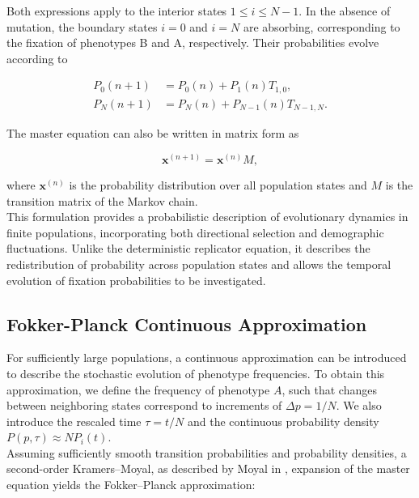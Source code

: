 Both expressions apply to the interior states \(1\leq i\leq N-1\). In the absence of mutation, the boundary states \(i=0\) and \(i=N\) are absorbing, corresponding to the fixation of phenotypes B and A, respectively. Their probabilities evolve according to

\begin{equation}
\begin{aligned}
P_0(n+1)&=P_0(n)+P_1(n)T_{1,0},\\
P_N(n+1)&=P_N(n)+P_{N-1}(n)T_{N-1,N}.
\end{aligned}
\label{eq:master_boundaries}
\end{equation}

The master equation can also be written in matrix form as

\begin{equation}
\mathbf{x}^{(n+1)}=\mathbf{x}^{(n)}M,
\label{eq:master_matrix}
\end{equation}

where \(\mathbf{x}^{(n)}\) is the probability distribution over all population states and \(M\) is the transition matrix of the Markov chain. \\ 

This formulation provides a probabilistic description of evolutionary dynamics in finite populations, incorporating both directional selection and demographic fluctuations. Unlike the deterministic replicator equation, it describes the redistribution of probability across population states and allows the temporal evolution of fixation probabilities to be investigated.


\clearpage 


\subsection{Fokker-Planck Continuous Approximation}
\label{sec:fokker}
For sufficiently large populations, a continuous
approximation can be introduced to describe the stochastic
evolution of phenotype frequencies. To obtain this approximation, we define the frequency of
phenotype  \(A\), such that changes between
neighboring states correspond to increments of
\(\Delta p=1/N\). We also introduce the rescaled time
\(\tau=t/N\) and the continuous probability density
\(P(p,\tau)\approx NP_i(t)\). \\ 

Assuming sufficiently smooth transition probabilities
and probability densities, a second-order Kramers--Moyal, as described by Moyal in \cite{moyalStochasticProcessesStatistic1949},
expansion of the master equation yields the
Fokker--Planck approximation: 


